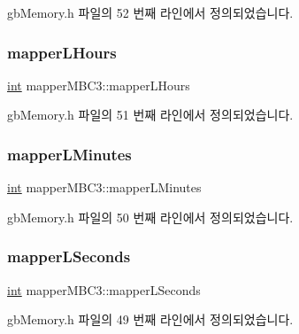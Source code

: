 gb\+Memory.\+h 파일의 52 번째 라인에서 정의되었습니다.

\mbox{\label{structmapper_m_b_c3_a57baf0090734e5934fcc90b2a4ed371e}} 
\subsubsection{\texorpdfstring{mapper\+L\+Hours}{mapperLHours}}
{\footnotesize\ttfamily \mbox{\hyperlink{_util_8cpp_a0ef32aa8672df19503a49fab2d0c8071}{int}} mapper\+M\+B\+C3\+::mapper\+L\+Hours}



gb\+Memory.\+h 파일의 51 번째 라인에서 정의되었습니다.

\mbox{\label{structmapper_m_b_c3_adb3ee748b8ab95c0a0838149852d38f7}} 
\subsubsection{\texorpdfstring{mapper\+L\+Minutes}{mapperLMinutes}}
{\footnotesize\ttfamily \mbox{\hyperlink{_util_8cpp_a0ef32aa8672df19503a49fab2d0c8071}{int}} mapper\+M\+B\+C3\+::mapper\+L\+Minutes}



gb\+Memory.\+h 파일의 50 번째 라인에서 정의되었습니다.

\mbox{\label{structmapper_m_b_c3_a5c7710784dadb3e7060dbb0b9142b704}} 
\subsubsection{\texorpdfstring{mapper\+L\+Seconds}{mapperLSeconds}}
{\footnotesize\ttfamily \mbox{\hyperlink{_util_8cpp_a0ef32aa8672df19503a49fab2d0c8071}{int}} mapper\+M\+B\+C3\+::mapper\+L\+Seconds}



gb\+Memory.\+h 파일의 49 번째 라인에서 정의되었습니다.

